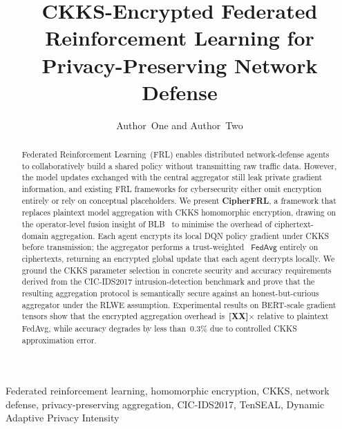 \documentclass[letterpaper,journal]{IEEEtran}
\newcommand{\FedAvg}{\mathsf{FedAvg}}
\begin{document}
\title{CKKS-Encrypted Federated Reinforcement Learning for\\
       Privacy-Preserving Network Defense}

\author{Author~One and Author~Two%
}

\maketitle

\begin{abstract}
Federated Reinforcement Learning~(FRL) enables distributed network-defense
agents to collaboratively build a shared policy without transmitting raw
traffic data.
However, the model updates exchanged with the central aggregator still leak
private gradient information, and existing FRL frameworks for cybersecurity
either omit encryption entirely or rely on conceptual placeholders.
We present \textbf{CipherFRL}, a framework that replaces plaintext model
aggregation with CKKS homomorphic encryption, drawing on the operator-level
fusion insight of BLB~\cite{blb2025} to minimise the overhead of
ciphertext-domain aggregation.
Each agent encrypts its local DQN policy gradient under CKKS before
transmission; the aggregator performs a trust-weighted~\cite{frlconf2026}
$\FedAvg{}$ entirely on ciphertexts, returning an encrypted global update that
each agent decrypts locally.
We ground the CKKS parameter selection in concrete security and accuracy
requirements derived from the CIC-IDS2017 intrusion-detection benchmark and
prove that the resulting aggregation protocol is semantically secure against
an honest-but-curious aggregator under the RLWE assumption.
Experimental results on BERT-scale gradient tensors show that the encrypted
aggregation overhead is~\textbf{[XX]$\times$} relative to plaintext FedAvg,
while accuracy degrades by less than~0.3\% due to controlled CKKS approximation
error.
\end{abstract}

\begin{IEEEkeywords}
Federated reinforcement learning, homomorphic encryption, CKKS, network defense,
privacy-preserving aggregation, CIC-IDS2017, TenSEAL, Dynamic Adaptive Privacy
Intensity
\end{IEEEkeywords}
\end{document}
